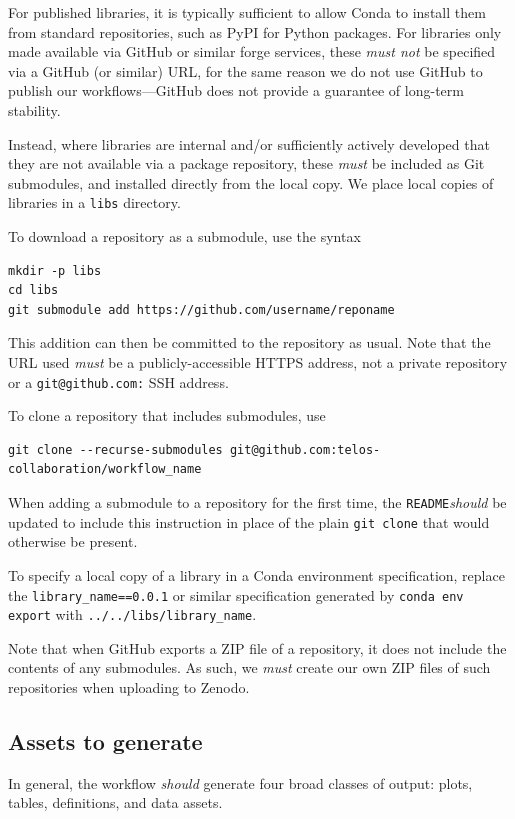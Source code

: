 \documentclass{article}
\newcommand\rfcword[1]{\emph{#1}\xspace}
\newcommand\must{\rfcword{must}}
\newcommand\mustnot{\rfcword{must not}}
\newcommand\should{\rfcword{should}}
\newcommand\filename[1]{\texttt{#1}\xspace}
\newcommand\readme{\filename{README}}
\begin{document}
For published libraries,
it is typically sufficient to allow Conda to install them from standard repositories,
such as PyPI for Python packages.
For libraries only made available via GitHub or similar forge services,
these \mustnot be specified via a GitHub
(or similar)
URL,
for the same reason we do not use GitHub to publish our workflows---GitHub
does not provide a guarantee of long-term stability.

Instead,
where libraries are internal and/or sufficiently actively developed that
they are not available via a package repository,
these \must be included as Git submodules,
and installed directly from the local copy.
We place local copies of libraries in a \filename{libs} directory.

To download a repository as a submodule,
use the syntax
\begin{verbatim}
mkdir -p libs
cd libs
git submodule add https://github.com/username/reponame
\end{verbatim}
This addition can then be committed to the repository as usual.
Note that the URL used \must be a publicly-accessible HTTPS address,
not a private repository or a \texttt{git@github.com:} SSH address.

To clone a repository that includes submodules,
use
\begin{verbatim}
git clone --recurse-submodules git@github.com:telos-collaboration/workflow_name
\end{verbatim}
When adding a submodule to a repository for the first time,
the \readme \should be updated to include this instruction in place of
the plain \texttt{git clone} that would otherwise be present.

To specify a local copy of a library in a Conda environment specification,
replace the \verb|library_name==0.0.1| or similar specification
generated by \texttt{conda env export}
with \verb|../../libs/library_name|.

Note that when GitHub exports a ZIP file of a repository,
it does not include the contents of any submodules.
As such,
we \must create our own ZIP files of such repositories when uploading to Zenodo.

\subsection{Assets to generate}\label{sec:assets}

In general,
the workflow \should generate four broad classes of output:
plots,
tables,
definitions,
and data assets.
\end{document}
